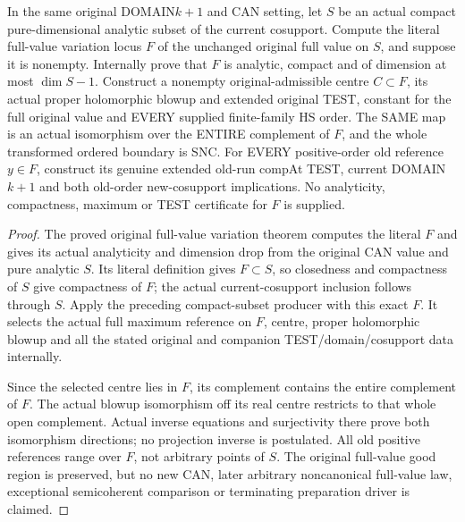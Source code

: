 \begin{theorem}
\label{hir:original-actual-variation-simultaneous-companion-next-test}
\leanok
In the same original DOMAIN$k+1$ and CAN setting, let $S$ be an actual
compact pure-dimensional analytic subset of the current cosupport.
Compute the literal full-value variation locus $F$ of the unchanged
original full value on $S$, and suppose it is nonempty. Internally prove
that $F$ is analytic, compact and of dimension at most $\dim S-1$.
Construct a nonempty original-admissible centre $C\subset F$, its actual
proper holomorphic blowup and extended original TEST, constant for the
full original value and EVERY supplied finite-family HS order. The SAME
map is an actual isomorphism over the ENTIRE complement of $F$, and the
whole transformed ordered boundary is SNC. For EVERY positive-order old
reference $y\in F$, construct its genuine extended old-run compAt TEST,
current DOMAIN$k+1$ and both old-order new-cosupport implications. No
analyticity, compactness, maximum or TEST certificate for $F$ is supplied.
\end{theorem}
\begin{proof}
The proved original full-value variation theorem computes the literal $F$
and gives its actual analyticity and dimension drop from the original CAN
value and pure analytic $S$. Its literal definition gives $F\subset S$,
so closedness and compactness of $S$ give compactness of $F$; the actual
current-cosupport inclusion follows through $S$. Apply the preceding
compact-subset producer with this exact $F$. It selects the actual full
maximum reference on $F$, centre, proper holomorphic blowup and all the
stated original and companion TEST/domain/cosupport data internally.

Since the selected centre lies in $F$, its complement contains the entire
complement of $F$. The actual blowup isomorphism off its real centre
restricts to that whole open complement. Actual inverse equations and
surjectivity there prove both isomorphism directions; no projection inverse
is postulated. All old positive references range over $F$, not arbitrary
points of $S$. The original full-value good region is preserved, but no
new CAN, later arbitrary noncanonical full-value law, exceptional
semicoherent comparison or terminating preparation driver is claimed.
\end{proof}
